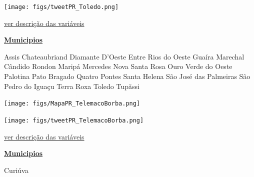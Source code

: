 \documentclass[10pt]{article} %
\begin{document}
\begin{minipage}[t]{.66\linewidth}
\begin{center}
\texttt{[image: figs/tweetPR\_Toledo.png]}\end{center}
\begin{center}

\end{center}
\small{\hyperlink{vartab}{ver descrição das variáveis}}\end{minipage}\hfill\begin{minipage}[t]{.30\linewidth}
\begin{mdframed}[style=sidebar,frametitle={}]
\textbf{\hyperlink{municips}{Municipios}}\begin{itemize}\gsquare Assis Chateaubriand 
\gsquare Diamante D'Oeste 
\gsquare Entre Rios do Oeste 
\gsquare Guaíra 
\gsquare Marechal Cândido Rondon 
\gsquare Maripá 
\gsquare Mercedes 
\gsquare Nova Santa Rosa 
\gsquare Ouro Verde do Oeste 
\gsquare Palotina 
\gsquare Pato Bragado 
\gsquare Quatro Pontes 
\gsquare Santa Helena 
\gsquare São José das Palmeiras 
\gsquare São Pedro do Iguaçu 
\gsquare Terra Roxa 
\gsquare Toledo 
\gsquare Tupãssi 
\end{itemize}\BackToContents\end{mdframed}\hfill\end{minipage}\newpage\begin{minipage}[t]{.66\linewidth}
\hypertarget{TlmB}{}
\texttt{[image: figs/MapaPR\_TelemacoBorba.png]}\vspace{0.5cm}\vspace{0.5cm}\begin{center}
\texttt{[image: figs/tweetPR\_TelemacoBorba.png]}\end{center}
\begin{center}

\end{center}
\small{\hyperlink{vartab}{ver descrição das variáveis}}\end{minipage}\hfill\begin{minipage}[t]{.30\linewidth}
\begin{mdframed}[style=sidebar,frametitle={}]
\textbf{\hyperlink{municips}{Municipios}}\begin{itemize}\gsquare Curiúva 

\end{itemize}
\end{mdframed}
\end{minipage}
\end{document}
